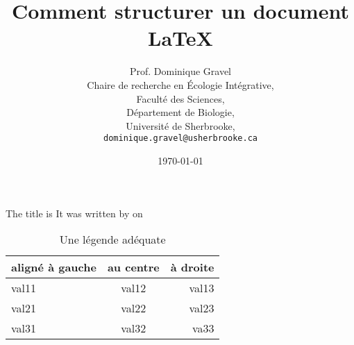 \documentclass[12pt]{article}
\title{Comment structurer un document \LaTeX{}}
\author{Prof. Dominique Gravel\\
   Chaire de recherche en Écologie Intégrative,\\
   Faculté des Sciences,\\
   Département de Biologie,\\
   Université de Sherbrooke,\\
   \texttt{dominique.gravel@usherbrooke.ca}}
\date{\today}
\begin{document}
\begin{titlepage}

The title is \@title
It was written by \@author\space on \@date

\end{titlepage}



\begin{table}[]
\centering
\caption{Une légende adéquate}
\label{my-label}
\begin{tabular}{lc|r}
aligné à gauche & au centre & à droite  \\
\hline
val11 & val12 & val13   \\
val21 & val22 & val23   \\
val31 & val32 & va33
\end{tabular}
\end{table}
\end{document}
